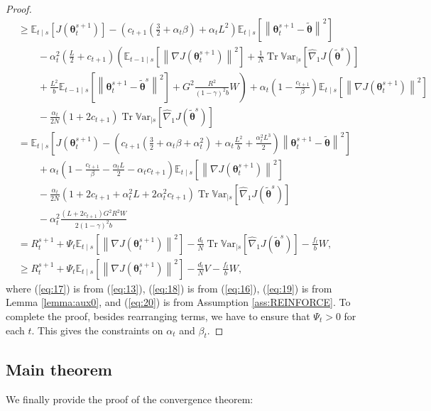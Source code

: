 \documentclass{article}
\theoremstyle{remark}
\theoremstyle{definition}
\DeclareMathOperator{\Tr}{Tr}
\newcommand{\norm}[2][\infty]{\left\|#2\right\|_{#1}}
\newcommand{\vtheta}{\boldsymbol{\theta}}
\newcommand{\gradJ}[1]{\nabla J(#1)}
\newcommand{\gradApp}[2]{\hat{\nabla}_{#2}J(#1)}
\newcommand{\Ets}[2][t]{\mathbb{E}_{#1\mid s}\left[#2\right]}
\newcommand{\Varts}[2][t]{{\mathbb{V}\text{ar}}_{#1\mid s}\left[#2\right]}
\newcommand{\VARRF}{V}
\newcommand{\VARIS}{W}
\begin{document}
\begin{proof}
\begin{align}
	&\geq  \Ets{J(\vtheta_t^{s+1})} - \left(c_{t+1}\left(\frac{3}{2}+\alpha_t\beta\right)+\alpha_tL^2\right)\Ets{\norm[]{\vtheta_{t}^{s+1}-\tilde{\vtheta}}^2} \nonumber\\
	&\qquad
	-\alpha_t^2\left(\frac{L}{2}+c_{t+1}\right)\left(\Ets[t-1]{\norm[]{\gradJ{\vtheta_t^{s+1}}}^2} 
	+\frac{1}{N}\Tr\Varts[]{\gradApp{\tilde{\vtheta}^s}{1}}
	\right.\nonumber\\
	&\left.\qquad+\frac{L^2}{b}\Ets[t-1]{\norm[]{\vtheta_t^{s+1}-\tilde{\vtheta}^s}^2}
	+G^2\frac{R^2}{(1-\gamma)^2b}W\right)
	+\alpha_t\left(1-\frac{c_{t+1}}{\beta}\right)\Ets{\norm[]{\gradJ{\vtheta_t^{s+1}}}^2} \nonumber\\
	&\qquad-\frac{\alpha_t}{2N}\left(1+2c_{t+1}\right)\Tr\Varts[]{\gradApp{\tilde{\vtheta}^s}{1}} \label{eq:19}\\
	& = \Ets{J(\vtheta_t^{s+1}) - \left(c_{t+1}\left(\frac{3}{2}+\alpha_t\beta+\alpha_t^2\right)+\alpha_t\frac{L^2}{b}+\frac{\alpha_t^2L^3}{2}\right)\norm[]{\vtheta_{t}^{s+1}-\tilde{\vtheta}}^2} \nonumber\\
	&\qquad
	+\alpha_t\left(1-\frac{c_{t+1}}{\beta}-\frac{\alpha_tL}{2}-\alpha_tc_{t+1}\right)\Ets{\norm[]{\gradJ{\vtheta_t^{s+1}}}^2} \nonumber\\
	&\qquad-\frac{\alpha_t}{2N}\left(1+2c_{t+1}+\alpha_t^2L+2\alpha_t^2c_{t+1}\right)\Tr\Varts[]{\gradApp{\tilde{\vtheta}^s}{1}} \nonumber\\
	&\qquad-\alpha_t^2\frac{(L+2c_{t+1})G^2R^2\VARIS}{2(1-\gamma)^2b} \nonumber\\
	&= R_t^{s+1}
	+\Psi_t\Ets{\norm[]{\gradJ{\vtheta_t^{s+1}}}^2}
	-\frac{d_t}{N}\Tr\Varts[]{\gradApp{\tilde{\vtheta}^s}{1}}
	-\frac{f_t}{b}\VARIS,\nonumber\\
	&\geq R_t^{s+1}
	+\Psi_t\Ets{\norm[]{\gradJ{\vtheta_t^{s+1}}}^2}
	-\frac{d_t}{N}\VARRF
	-\frac{f_t}{b}\VARIS, \label{eq:20}
\end{align}
where (\ref{eq:17}) is from (\ref{eq:13}), (\ref{eq:18}) is from (\ref{eq:16}), (\ref{eq:19}) is from Lemma \ref{lemma:aux0}, and (\ref{eq:20}) is from Assumption \ref{ass:REINFORCE}.
To complete the proof, besides rearranging terms, we have to ensure that $\Psi_t>0$ for each $t$. This gives the constraints on $\alpha_t$ and $\beta_t$.
\end{proof}


\subsection*{Main theorem}
We finally provide the proof of the convergence theorem:
\end{document}
